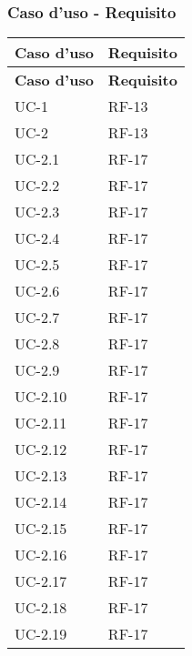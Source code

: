 \subsubsection{Caso d'uso - Requisito}
\begin{longtable}{|>{\centering\arraybackslash}m{}|>{\centering\arraybackslash}m{}|}
	\hline
	\textbf{Caso d'uso} & \textbf{Requisito}      \\\hline
	\endfirsthead
	\hline
	\textbf{Caso d'uso} & \textbf{Requisito}      \\\hline
	\endhead
	UC-1                & RF-13                   \\\hline
	UC-2                & RF-13                   \\\hline
	UC-2.1              & RF-17                   \\\hline
	UC-2.2              & RF-17                   \\\hline
	UC-2.3              & RF-17                   \\\hline
	UC-2.4              & RF-17                   \\\hline
	UC-2.5              & RF-17                   \\\hline
	UC-2.6              & RF-17                   \\\hline
	UC-2.7              & RF-17                   \\\hline
	UC-2.8              & RF-17                   \\\hline
	UC-2.9              & RF-17                   \\\hline
	UC-2.10             & RF-17                   \\\hline
	UC-2.11             & RF-17                   \\\hline
	UC-2.12             & RF-17                   \\\hline
	UC-2.13             & RF-17                   \\\hline
	UC-2.14             & RF-17                   \\\hline
	UC-2.15             & RF-17                   \\\hline
	UC-2.16             & RF-17                   \\\hline
	UC-2.17             & RF-17                   \\\hline
	UC-2.18             & RF-17                   \\\hline
	UC-2.19             & RF-17                   \\\hline

\end{longtable}
